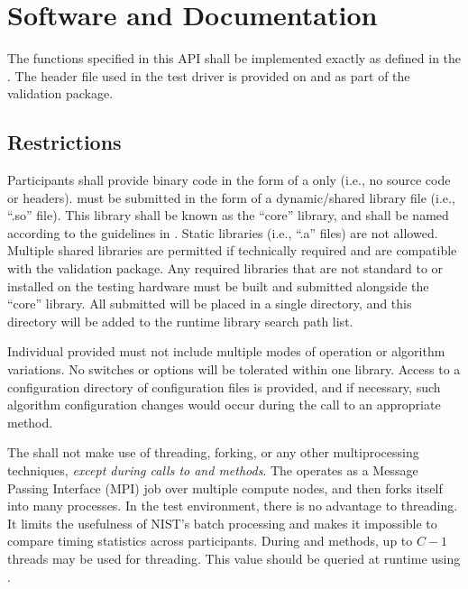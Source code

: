 \section{Software and Documentation}
\label{sec:software}

The functions specified in this API shall be implemented exactly as
defined in the \lib. The header file used in the test driver is
provided on \theprojectwebsite and as part of the validation package.

\subsection{Restrictions}
\label{subsec:software-restrictions}
Participants shall provide binary code in the form of a \lib only
(i.e., no source code or headers). \Libs must be submitted in the form of a
dynamic/shared library file (i.e., ``.so'' file). This library shall be known as
the ``core'' library, and shall be named according to the guidelines in
. Static libraries (i.e., ``.a'' files) are not
allowed. Multiple shared libraries are permitted if technically required and are
compatible with the validation package. Any required libraries that are not
standard to \os or installed on the testing hardware must be built and submitted
alongside the ``core'' library. All submitted \libs will be placed in a single
directory, and this directory will be added to the runtime library search path
list.

Individual \libs provided must not include multiple modes of operation or
algorithm variations. No switches or options will be tolerated within one
library. Access to a configuration directory of configuration files is provided,
and if necessary, such algorithm configuration changes would occur during the
call to an appropriate  method.

The \lib shall not make use of threading, forking, or any other multiprocessing
techniques, \textit{except during calls to  and
 methods}. The \testdriver operates as a Message Passing Interface
(MPI) job over multiple compute nodes, and then forks itself into many
processes. In the test environment, there is no advantage to threading. It
limits the usefulness of NIST's batch processing and makes it impossible to
compare timing statistics across participants. During
 and  methods, up to $C-1$ threads may be
used for threading. This value should be queried at runtime using
.

